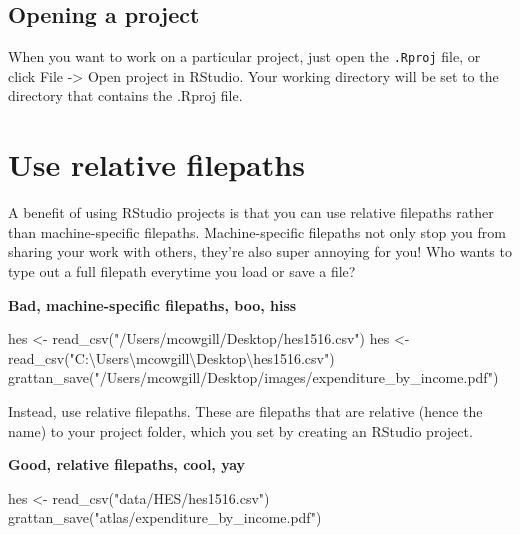 \documentclass[
]{book}
\newenvironment{Shaded}{\begin{snugshade}}{\end{snugshade}}
\newcommand{\FunctionTok}[1]{\textcolor[rgb]{0.00,0.00,0.00}{#1}}
\newcommand{\NormalTok}[1]{#1}
\newcommand{\OtherTok}[1]{\textcolor[rgb]{0.56,0.35,0.01}{#1}}
\newcommand{\StringTok}[1]{\textcolor[rgb]{0.31,0.60,0.02}{#1}}
\begin{document}
\hypertarget{opening-a-project}{%
\subsection{Opening a project}\label{opening-a-project}}

When you want to work on a particular project, just open the \texttt{.Rproj} file, or click File -\textgreater{} Open project in RStudio. Your working directory will be set to the directory that contains the .Rproj file.

\hypertarget{use-relative-filepaths}{%
\section{Use relative filepaths}\label{use-relative-filepaths}}

A benefit of using RStudio projects is that you can use relative filepaths rather than machine-specific filepaths. Machine-specific filepaths not only stop you from sharing your work with others, they're also super annoying for you! Who wants to type out a full filepath everytime you load or save a file?

\textbf{Bad, machine-specific filepaths, boo, hiss}

\begin{Shaded}
\begin{Highlighting}[]
\NormalTok{hes }\OtherTok{\textless{}{-}} \FunctionTok{read\_csv}\NormalTok{(}\StringTok{"/Users/mcowgill/Desktop/hes1516.csv"}\NormalTok{)}
\NormalTok{hes }\OtherTok{\textless{}{-}} \FunctionTok{read\_csv}\NormalTok{(}\StringTok{"C:\textbackslash{}Users\textbackslash{}mcowgill\textbackslash{}Desktop\textbackslash{}hes1516.csv"}\NormalTok{)}
\FunctionTok{grattan\_save}\NormalTok{(}\StringTok{"/Users/mcowgill/Desktop/images/expenditure\_by\_income.pdf"}\NormalTok{)}
\end{Highlighting}
\end{Shaded}

Instead, use relative filepaths. These are filepaths that are relative (hence the name) to your project folder, which you set by creating an RStudio project.

\textbf{Good, relative filepaths, cool, yay}

\begin{Shaded}
\begin{Highlighting}[]
\NormalTok{hes }\OtherTok{\textless{}{-}} \FunctionTok{read\_csv}\NormalTok{(}\StringTok{"data/HES/hes1516.csv"}\NormalTok{)}
\FunctionTok{grattan\_save}\NormalTok{(}\StringTok{"atlas/expenditure\_by\_income.pdf"}\NormalTok{)}
\end{Highlighting}
\end{Shaded}
\end{document}
